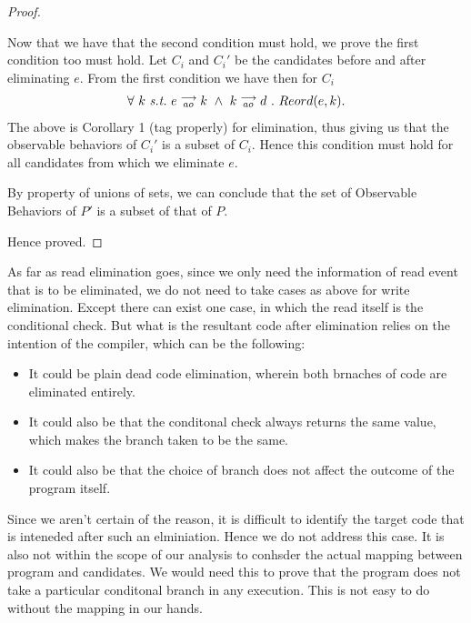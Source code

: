 \begin{proof}
\begin{itemize}

                
        \end{itemize}

        Now that we have that the second condition must hold, we prove the first condition too must hold. Let $C_i$ and $C_i'$ be the candidates before and after eliminating $e$. From the first condition we have then for $C_i$
        \begin{align*}
            \forall \ k \ \textit{s.t.} \ 
            \reln{e}{ao}{k} \ \wedge \ \reln{k}{ao}{d} \ . \ 
            Reord(e,k).
        \end{align*}
        The above is Corollary 1 (tag properly) for elimination, thus giving us that the observable behaviors of $C_i'$ is a subset of $C_i$. Hence this condition must hold for all candidates from which we eliminate $e$. 

        By property of unions of sets, we can conclude that the set of Observable Behaviors of $P'$ is a subset of that of $P$.

        Hence proved.

    \end{proof}

    As far as read elimination goes, since we only need the information of read event that is to be eliminated, we do not need to take cases as above for write elimination. Except there can exist one case, in which the read itself is the conditional check. But what is the resultant code after elimination relies on the intention of the compiler, which can be the following:
    \begin{itemize}
        \item It could be plain dead code elimination, wherein both brnaches of code are eliminated entirely. 
        \item It could also be that the conditonal check always returns the same value, which makes the branch taken to be the same. 
        \item It could also be that the choice of branch does not affect the outcome of the program itself. 
    \end{itemize}
    
    Since we aren't certain of the reason, it is difficult to identify the target code that is inteneded after such an elminiation. Hence we do not address this case. It is also not within the scope of our analysis to conhsder the actual mapping between program and candidates. We would need this to prove that the program does not take a particular conditonal branch in any execution. This is not easy to do without the mapping in our hands. 